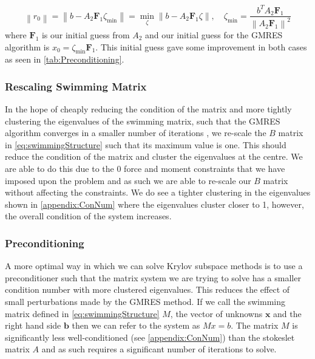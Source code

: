 \begin{equation*}
    \left\|r_{0}\right\|=\left\|b-A_2 \bm{F}_1 \zeta_{\min }\right\|=\min _{\zeta}\left\|b-A_2 \bm{F}_1 \zeta\right\|, \quad \zeta_{\min }=\frac{b^{T} A_2 \bm{F}_1}{\left\|A_2 \bm{F}_1\right\|^{2}}
    \label{eq:Hegedus}
\end{equation*}
where $\bm{F}_1$ is our initial guess from $A_2$ and our initial guess for the GMRES algorithm is $x_0 = \zeta_{\min} \bm{F}_1$. This initial guess gave some improvement in both cases as seen in \cref{tab:Preconditioning}.

\subsubsection{Rescaling Swimming Matrix} \label{sec:Rescale}
In the hope of cheaply reducing the condition of the matrix and more tightly clustering the eigenvalues of the swimming matrix, such that the GMRES algorithm converges in a smaller number of iterations \cite{CampbellGMRES}, we re-scale the $B$ matrix in \cref{eq:swimmingStructure} such that its maximum value is one. This should reduce the condition of the matrix and cluster the eigenvalues at the centre. We are able to do this due to the $0$ force and moment constraints that we have imposed upon the problem and as such we are able to re-scale our $B$ matrix without affecting the constraints. 
We do see a tighter clustering in the eigenvalues shown in \cref{appendix:ConNum} where the eigenvalues cluster closer to 1, however, the overall condition of the system increases.


\subsubsection{Preconditioning} \label{sec:Preconditioning}
A more optimal way in which we can solve Krylov subspace methods is to use a preconditioner such that the matrix system we are trying to solve has a smaller condition number with more clustered eigenvalues. This reduces the effect of small perturbations made by the GMRES method. If we call the swimming matrix defined in \cref{eq:swimmingStructure} $M$, the vector of unknowns $\bm{x}$ and the right hand side $\bm{b}$ then we can refer to the system as $Mx=b$. The matrix $M$ is significantly less well-conditioned (see \cref{appendix:ConNum}) than the stokeslet matrix $A$ and as such requires a significant number of iterations to solve.

